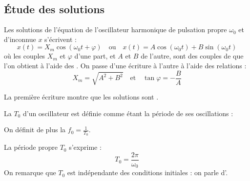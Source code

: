 \subsection{Étude des solutions}

\begin{propriete}
Les solutions de l'équation de l'oscillateur harmonique de pulsation propre $\omega_0$ et d'inconnue $x$ s'écrivent :
\[x(t) = X_m \cos(\omega_0 t + \varphi) \quad \text{ou} \quad x(t) = A \cos(\omega_0 t) + B \sin(\omega_0 t)\]
où les couples $X_m$ et $\varphi$ d'une part, et $A$ et $B$ de l'autre, sont des couples de  que l'on obtient à l'aide des . On passe d'une écriture à l'autre à l'aide des relations :
\[X_m = \sqrt{A^2 + B^2} \quad \text{et} \quad \tan \varphi = - \frac{B}{A}\]
\end{propriete}

\begin{remarque}
La première écriture montre que les solutions sont .
\end{remarque}

\begin{definition}
La  $T_0$ d'un oscillateur est définie comme étant la période de ses oscillations :

\begin{figure}[H]
\begin{center}
\end{center}
\end{figure}

\noindent On définit de plus la  $f_0 = \frac{1}{T_0}$.
\end{definition}

\begin{propriete}
La période propre $T_0$ s'exprime :
\[T_0 = \frac{2\pi}{\omega_0}\]
On remarque que $T_0$ est indépendante des conditions initiales : on parle d'.
\end{propriete}



